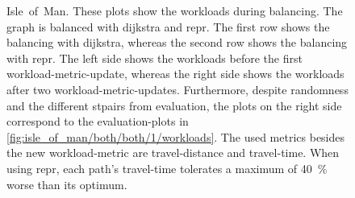         \begin{figure}[hbp]
            \centering%
            \hfill%

            \hfill%
            \caption[Workloads during balancing Isle~of~Man in comparison]{%
                Isle~of~Man.
                These plots show the workloads during \gls{balancing}.
                The graph is balanced with \gls{dijkstra} and \gls{repr}.
                The first row shows the \gls{balancing} with \gls{dijkstra}, whereas the second row shows the \gls{balancing} with \gls{repr}.
                The left side shows the workloads before the first workload-\gls{metric}-update, whereas the right side shows the workloads after two workload-\gls{metric}-updates.
                Furthermore, despite randomness and the different \glspl{stpair} from evaluation, the plots on the right side correspond to the evaluation-plots in \vref{fig:isle_of_man/both/both/1/workloads}.
                The used \glspl{metric} besides the new workload-\gls{metric} are travel-distance and travel-time.
                When using \gls{repr}, each path's travel-time tolerates a maximum of \si{\num{40} \percent} worse than its optimum.
                \label{fig:isle_of_man/both/2/workloads}
            }
        \end{figure}

